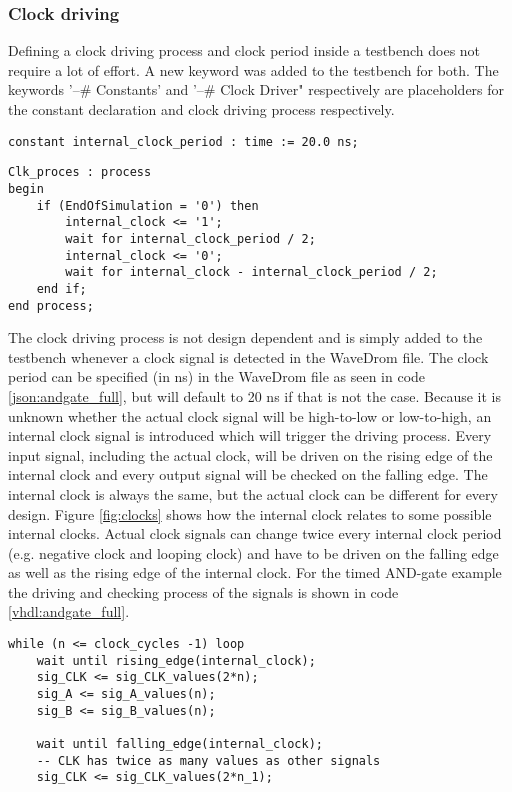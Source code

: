 \subsubsection{Clock driving}
Defining a clock driving process and clock period inside a testbench does not require a lot of effort. A new keyword was added to the testbench for both. The keywords '--\# Constants' and  '--\# Clock Driver" respectively are placeholders for the constant declaration and clock driving process respectively. 
\begin{lstlisting}[style=vhdl, caption={Definition of a std\_logic array}, label={vhdl:clock_period}]
constant internal_clock_period : time := 20.0 ns;
\end{lstlisting}\noindent
\begin{lstlisting}[style=vhdl, caption={Signal driving in clocked designs}, label={vhdl:driving_signals}]
Clk_proces : process
begin
	if (EndOfSimulation = '0') then
		internal_clock <= '1';
		wait for internal_clock_period / 2;
		internal_clock <= '0';
		wait for internal_clock - internal_clock_period / 2;
	end if;
end process;
\end{lstlisting}\noindent
The clock driving process is not design dependent and is simply added to the testbench whenever a clock signal is detected in the WaveDrom file. The clock period can be specified (in ns) in the WaveDrom file as seen in code \ref{json:andgate_full}, but will default to 20 ns if that is not the case.
\npar
Because it is unknown whether the actual clock signal will be high-to-low or low-to-high, an internal clock signal is introduced which will trigger the driving process. Every input signal, including the actual clock, will be driven on the rising edge of the internal clock and every output signal will be checked on the falling edge. The internal clock is always the same, but the actual clock can be different for every design. Figure \ref{fig:clocks} shows how the internal clock relates to some possible internal clocks.%
\nline
Actual clock signals can change twice every internal clock period (e.g. negative clock and looping clock) and have to be driven on the falling edge as well as the rising edge of the internal clock. For the timed AND-gate example the driving and checking process of the signals is shown in code \ref{vhdl:andgate_full}.
\begin{lstlisting}[style=vhdl, caption={Signal driving in the AND-gate test derived from the source file in code \ref{json:andgate_full}}, label={vhdl:andgate_full}]
while (n <= clock_cycles -1) loop
	wait until rising_edge(internal_clock);
	sig_CLK <= sig_CLK_values(2*n);		
	sig_A <= sig_A_values(n);
	sig_B <= sig_B_values(n);
	
	wait until falling_edge(internal_clock);
	-- CLK has twice as many values as other signals
	sig_CLK <= sig_CLK_values(2*n_1);	
\end{lstlisting}\noindent

